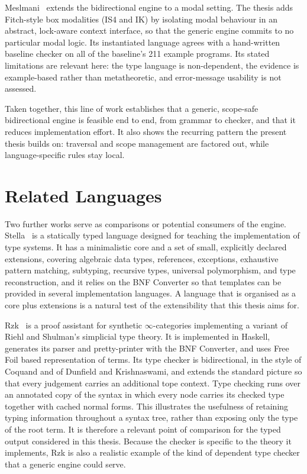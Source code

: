 Meslmani~\cite{meslmani2026thesis} extends the bidirectional engine to a modal setting. The thesis adds Fitch-style box modalities (IS4 and IK) by isolating modal behaviour in an abstract, lock-aware context interface, so that the generic engine commits to no particular modal logic. Its instantiated language agrees with a hand-written baseline checker on all of the baseline's 211 example programs. Its stated limitations are relevant here: the type language is non-dependent, the evidence is example-based rather than metatheoretic, and error-message usability is not assessed.

Taken together, this line of work establishes that a generic, scope-safe bidirectional engine is feasible end to end, from grammar to checker, and that it reduces implementation effort. It also shows the recurring pattern the present thesis builds on: traversal and scope management are factored out, while language-specific rules stay local.

\section{Related Languages}
\label{sec:lr-languages}

Two further works serve as comparisons or potential consumers of the engine. Stella~\cite{abounegm2024stella} is a statically typed language designed for teaching the implementation of type systems. It has a minimalistic core and a set of small, explicitly declared extensions, covering algebraic data types, references, exceptions, exhaustive pattern matching, subtyping, recursive types, universal polymorphism, and type reconstruction, and it relies on the BNF Converter so that templates can be provided in several implementation languages. A language that is organised as a core plus extensions is a natural test of the extensibility that this thesis aims for.

Rzk~\cite{kudasov2026rzk} is a proof assistant for synthetic $\infty$-categories implementing a variant of Riehl and Shulman's simplicial type theory. It is implemented in Haskell, generates its parser and pretty-printer with the BNF Converter, and uses Free Foil based representation of terms. Its type checker is bidirectional, in the style of Coquand and of Dunfield and Krishnaswami, and extends the standard picture so that every judgement carries an additional tope context. Type checking runs over an annotated copy of the syntax in which every node carries its checked type together with cached normal forms. This illustrates the usefulness of retaining typing information throughout a syntax tree, rather than exposing only the type of the root term. It is therefore a relevant point of comparison for the typed output considered in this thesis. Because the checker is specific to the theory it implements, Rzk is also a realistic example of the kind of dependent type checker that a generic engine could serve.

